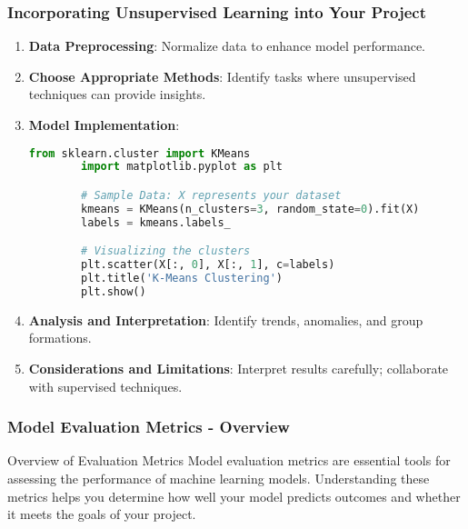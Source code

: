 \documentclass[aspectratio=169]{beamer}
\begin{document}
\begin{frame}[fragile]
    \frametitle{Incorporating Unsupervised Learning into Your Project}
    \begin{enumerate}
        \item \textbf{Data Preprocessing}: Normalize data to enhance model performance.
        \item \textbf{Choose Appropriate Methods}: Identify tasks where unsupervised techniques can provide insights.
        \item \textbf{Model Implementation}:
        \begin{lstlisting}[language=Python]
        from sklearn.cluster import KMeans
        import matplotlib.pyplot as plt

        # Sample Data: X represents your dataset
        kmeans = KMeans(n_clusters=3, random_state=0).fit(X)
        labels = kmeans.labels_

        # Visualizing the clusters
        plt.scatter(X[:, 0], X[:, 1], c=labels)
        plt.title('K-Means Clustering')
        plt.show()
        \end{lstlisting}
        \item \textbf{Analysis and Interpretation}: Identify trends, anomalies, and group formations.
        \item \textbf{Considerations and Limitations}: Interpret results carefully; collaborate with supervised techniques.
    \end{enumerate}
\end{frame}

\begin{frame}[fragile]
    \frametitle{Model Evaluation Metrics - Overview}
    \begin{block}{Overview of Evaluation Metrics}
        Model evaluation metrics are essential tools for assessing the performance of machine learning models. Understanding these metrics helps you determine how well your model predicts outcomes and whether it meets the goals of your project.
    \end{block}
\end{frame}
\end{document}
